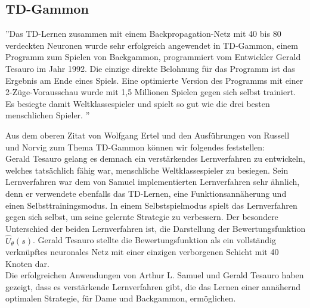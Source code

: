 \subsection{TD-Gammon}
\label{subsec:TD-Gammon}
''Das TD-Lernen zusammen mit einem Backpropagation-Netz mit 40 bis 80 verdeckten Neuronen wurde sehr erfolgreich angewendet in TD-Gammon, einem Programm zum Spielen von Backgammon, programmiert vom Entwickler Gerald Tesauro im Jahr 1992. Die einzige direkte Belohnung für das Programm ist das Ergebnis am Ende eines Spiels. Eine optimierte Version des Programms mit einer 2-Züge-Vorausschau wurde mit 1,5 Millionen Spielen gegen sich selbst trainiert. Es besiegte damit Weltklassespieler und spielt so gut wie die drei besten menschlichen Spieler. \cite[304]{Ertel}''

Aus dem oberen Zitat von Wolfgang Ertel und den Ausführungen von Russell und Norvig \cite[982]{Russell} zum Thema TD-Gammon können wir folgendes feststellen: \\

Gerald Tesauro gelang es demnach ein verstärkendes Lernverfahren zu entwickeln, welches tatsächlich fähig war, menschliche Weltklassespieler zu besiegen. Sein Lernverfahren war dem von Samuel implementierten Lernverfahren sehr ähnlich, denn er verwendete ebenfalls das TD-Lernen, eine Funktionsannäherung und einen Selbsttrainingsmodus. In einem Selbstspielmodus spielt das Lernverfahren gegen sich selbst, um seine gelernte Strategie zu verbessern. Der besondere Unterschied der beiden Lernverfahren ist, die Darstellung der Bewertungsfunktion $\hat{U}_\theta(s)$. Gerald Tesauro stellte die Bewertungsfunktion als ein vollständig verknüpftes neuronales Netz mit einer einzigen verborgenen Schicht mit 40 Knoten dar. \\

Die erfolgreichen Anwendungen von Arthur L. Samuel und Gerald Tesauro haben gezeigt, dass es verstärkende Lernverfahren gibt, die das Lernen einer annähernd optimalen Strategie, für Dame und Backgammon, ermöglichen. \\